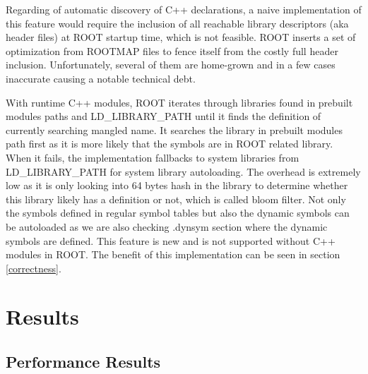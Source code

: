 \documentclass{webofc}
\begin{document}
Regarding of automatic discovery of C++ declarations, a naive implementation of this feature would require the inclusion of all reachable library descriptors (aka header files) at ROOT startup time, which is not feasible. ROOT inserts a set of optimization from ROOTMAP files to fence itself from the costly full header inclusion. Unfortunately, several of them are home-grown and in a few cases inaccurate causing a notable technical debt.

With runtime C++ modules, ROOT iterates through libraries found in prebuilt modules paths and LD\_LIBRARY\_PATH until it finds the definition of currently searching mangled name. It searches the library in prebuilt modules path first as it is more likely that the symbols are in ROOT related library. When it fails, the implementation fallbacks to system libraries from LD\_LIBRARY\_PATH for system library autoloading. The overhead is extremely low as it is only looking into 64 bytes hash in the library to determine whether this library likely has a definition or not, which is called bloom filter. Not only the symbols defined in regular symbol tables but also the dynamic symbols can be autoloaded as we are also checking .dynsym section where the dynamic symbols are defined. This feature is new and is not supported without C++ modules in ROOT. The benefit of this implementation can be seen in section \ref{correctness}.

\section{Results}
\label{results}

\subsection{Performance Results}
\label{performance}
\end{document}
